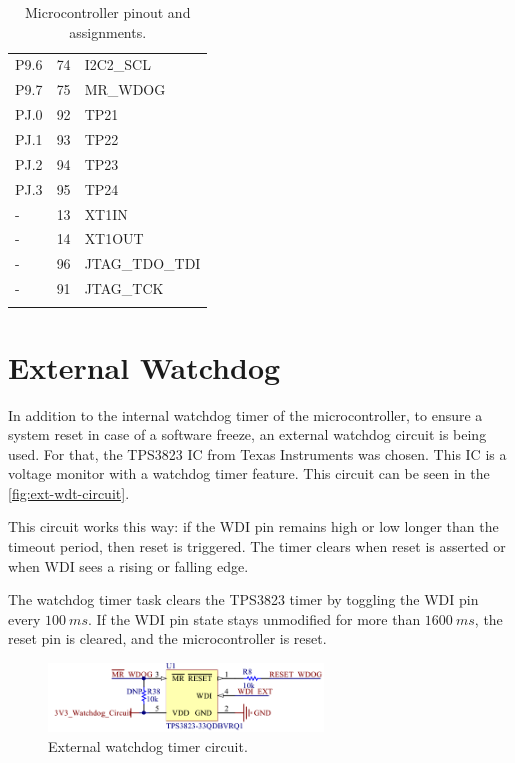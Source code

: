 \begin{longtable}{lcL{10cm}}
    P9.6              & 74                  & I2C2\_SCL             \\
    P9.7              & 75                  & MR\_WDOG              \\
    \midrule
    PJ.0              & 92                  & TP21                  \\
    PJ.1              & 93                  & TP22                  \\
    PJ.2              & 94                  & TP23                  \\
    PJ.3              & 95                  & TP24                  \\
    \midrule
    -                 & 13                  & XT1IN                 \\
    -                 & 14                  & XT1OUT                \\
    -                 & 96                  & JTAG\_TDO\_TDI        \\
    -                 & 91                  & JTAG\_TCK             \\
    \bottomrule[1.5pt]
    \caption{Microcontroller pinout and assignments.}
    \label{tab:mcu-pinout}
\end{longtable}

\section{External Watchdog}

In addition to the internal watchdog timer of the microcontroller, to ensure a system reset in case of a software freeze, an external watchdog circuit is being used. For that, the TPS3823 IC from Texas Instruments \cite{tps382x} was chosen. This IC is a voltage monitor with a watchdog timer feature. This circuit can be seen in the \autoref{fig:ext-wdt-circuit}.

This circuit works this way: if the WDI pin remains high or low longer than the timeout period, then reset is triggered. The timer clears when reset is asserted or when WDI sees a rising or falling edge.

The watchdog timer task clears the TPS3823 timer by toggling the WDI pin every $100\ ms$. If the WDI pin state stays unmodified for more than $1600\ ms$, the reset pin is cleared, and the microcontroller is reset.

\begin{figure}[!ht]
    \begin{center}
        \includegraphics[width=0.65\textwidth]{figures/ext-watchdog-circuit.png}
        \caption{External watchdog timer circuit.}
        \label{fig:ext-wdt-circuit}
    \end{center}
\end{figure}

